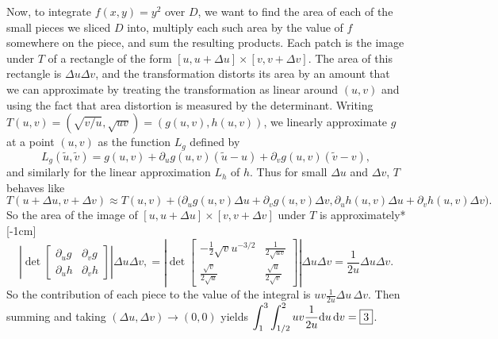 \documentclass{watsonbook}
\begin{document}
\begin{solution}
  Now, to integrate $f(x,y) = y^2$ over $D$, we want to find the area
  of each of the small pieces we sliced $D$ into, multiply each such
  area by the value of $f$ somewhere on the piece, and sum the
  resulting products. Each patch is the image under $T$ of a rectangle
  of the form $[u, u+\Delta u] \times [v, v + \Delta v]$. The area of
  this rectangle is $\Delta u \Delta v$, and the transformation
  distorts its area by an amount that we can approximate by treating
  the transformation as linear around $(u,v)$ and using the fact that
  area distortion is measured by the determinant. Writing
  $T(u,v) = (\sqrt{v/u}, \sqrt{uv}) = (g(u,v), h(u,v))$, we linearly
  approximate $g$ at a point $(u,v)$ as the function $L_g$ defined by
  \[
    L_g(\widetilde{u},\widetilde{v}) = g(u,v) + \partial_ug(u,v)(\widetilde{u} -
    u)+ \partial_vg(u,v)(\widetilde{v} -v), 
  \]
  and similarly for the linear approximation $L_h$ of $h$. Thus for
  small $\Delta u$ and $\Delta v$, $T$ behaves like  
  \begin{equation} \label{eq:Tuv} 
    T(u + \Delta u, v + \Delta v) \approx T(u,v) + \big( \partial_ug(u,v)
    \Delta u + \partial_v g(u,v) \Delta v, \partial_uh(u,v)
    \Delta u + \partial_v h(u,v) \Delta v \big). 
  \end{equation}
  So the area of the image of
  $[u, u+\Delta u] \times [v, v + \Delta v]$ under $T$ is
  approximately* [-1cm]
  \[
    \left| \det \left[
        \begin{array}{cc}
          \partial_u g & \partial _v g\\
          \partial_u h & \partial _v h 
        \end{array} \right]
    \right|\Delta u \Delta v,  =
    \left| \det \left[
        \begin{array}{cc}
          -\frac{1}{2}\sqrt{v}u^{-3/2} & \frac{1}{2\sqrt{uv}} \\
          \frac{\sqrt{v}}{2\sqrt{u}} & \frac{\sqrt{u}}{2\sqrt{v}}
        \end{array} \right]
    \right| \Delta u \Delta v  = \frac{1}{2u}
    \Delta u \Delta v. 
  \]
  So the contribution of each piece to the value of the integral is
  $uv \frac{1}{2u} \Delta u \, {\Delta}v$. Then summing and taking
  $(\Delta u, \Delta v) \to (0,0)$ yields
  $\displaystyle{\int_{1}^{3}\int_{1/2}^{2}uv \frac{1}{2u} \mathrm{d}u \,
    {\mathrm{d}}v = \boxed{3}}$.
\end{solution}
\end{document}
